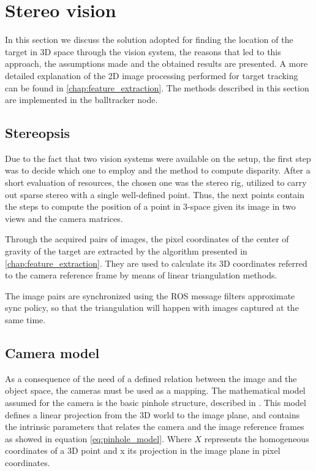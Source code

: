 
\chapter{Stereo vision} %
\label{chap:stereopsis}

In this section we discuss the solution adopted for finding the location of the target in 3D space through the vision system, the reasons that led to this approach, the assumptions made and the obtained results are presented.
A more detailed explanation of the 2D image processing performed for target tracking can be found in \ref{chap:feature_extraction}.
The methods described in this section are implemented in the balltracker node.

\section{Stereopsis}
Due to the fact that two vision systems were available on the setup, the first step was to decide which one to employ and the method to compute disparity.
After a short evaluation of resources, the chosen one was the stereo rig, utilized to carry out sparse stereo with a single well-defined point.
Thus, the next points contain the steps to compute the position of a point in 3-space given its image in two views and the camera matrices.

Through the acquired pairs of images, the pixel coordinates of the center of gravity of the target are extracted by the algorithm presented in \ref{chap:feature_extraction}.
They are used to calculate its 3D coordinates referred to the camera reference frame by means of linear triangulation methods.

The image pairs are synchronized using the ROS message filters approximate sync policy, so that the triangulation will happen with images captured at the same time.

\section{Camera model}
As a consequence of the need of a defined relation between the image and the object space, the cameras must be used as a mapping.
The mathematical model assumed for the camera is the basic pinhole structure, described in \cite{Hartley}.
This model defines a linear projection from the 3D world to the image plane, and contains the intrinsic parameters that relates the camera and the image reference frames as showed in equation \eqref{eq:pinhole_model}. Where $X$ represents the homogeneous coordinates of a 3D point and x its projection in the image plane in pixel coordinates.

